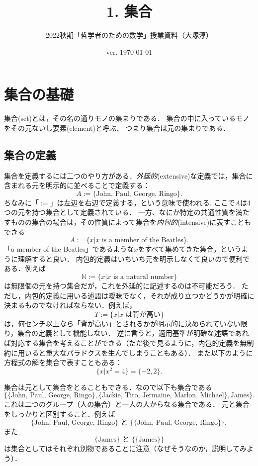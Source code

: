 \documentclass[11pt,a4paper]{jsarticle}
\begin{document}
\title{1. 集合}
\author{2022秋期「哲学者のための数学」授業資料（大塚淳）}
\date{ver. \today}
\maketitle

\section{集合の基礎}
集合(set)とは，その名の通りモノの集まりである．
集合の中に入っているモノをその元ないし要素(element)と呼ぶ．
つまり集合は元の集まりである．




\subsection{集合の定義}

集合を定義するには二つのやり方がある．\emph{外延的}(extensive)な定義では，集合に含まれる元を明示的に並べることで定義する：
\[
 A := \{\text{John, Paul, George, Ringo}\}.
\]
ちなみに「$:=$」は左辺を右辺で定義する，という意味で使われる.
ここで$A$は4つの元を持つ集合として定義されている．
一方、なにか特定の共通性質を満たすものの集合の場合は，その性質によって集合を\emph{内包的}(intensive)に表すこともできる
\[
 A := \{x | x \text{ is a member of the Beatles}\}.
\]
「a member of the Beatles」であるような$x$をすべて集めてきた集合，というように理解すると良い．
内包的定義はいちいち元を明示しなくて良いので便利である．例えば
\[
 \mathbb{N} := \{x | x \text{ is a natural number}\}
\]
は無限個の元を持つ集合だが，これを外延的に記述するのは不可能だろう．
ただし，内包的定義に用いる述語は曖昧でなく，それが成り立つかどうかが明確に決まるものでなければならない．例えば，
\[
 T := \{x | x \text{ は背が高い}\}
\]
は，何センチ以上なら「背が高い」とされるかが明示的に決められていない限り，集合の定義として機能しない．
逆に言うと，適用基準が明確な述語であれば対応する集合を考えることができる（ただ後で見るように，内包的定義を無制約に用いると重大なパラドクスを生んでしまうこともある）．
また以下のように方程式の解を集合で表すこともある：
\[
 \{ x | x^2 = 4\} = \{ -2, 2 \}.
\]


集合は元として集合をとることもできる．なので以下も集合である
\[
\{ \{\text{John, Paul, George, Ringo}\}, \{ \text{Jackie, Tito, Jermaine, Marlon, Michael}\}, \text{James} \}.
\]
これは二つのグループ（人の集合）と一人の人からなる集合である．
元と集合をしっかりと区別すること．例えば
\[
\{\text{John, Paul, George, Ringo}\} \text{ と } \{ \{\text{John, Paul, George, Ringo}\} \},
\]
また
\[
\{\text{James}\} \text{ と } \{ \{\text{James}\} \}  
\]
は集合としてはそれぞれ別物であることに注意（なぜそうなのか，説明してみよう）．
\end{document}

